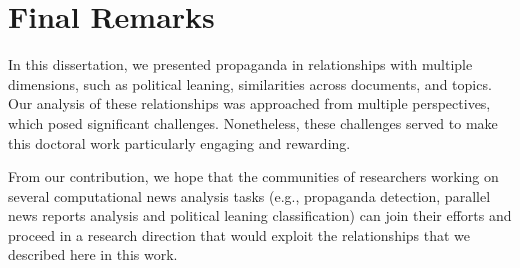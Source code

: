 \section{\statusgreen Final Remarks}
\label{sec:discussion_conclusions}

In this dissertation, we presented propaganda in relationships with multiple dimensions, such as political leaning, similarities across documents, and topics. Our analysis of these relationships was approached from multiple perspectives, which posed significant challenges. Nonetheless, these challenges served to make this doctoral work particularly engaging and rewarding.

From our contribution, we hope that the communities of researchers working on several computational news analysis tasks (e.g., propaganda detection, parallel news reports analysis and political leaning classification) can join their efforts and proceed in a research direction that would exploit the relationships that we described here in this work.
